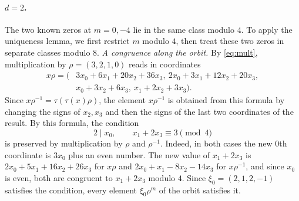 \documentclass[a4paper,11pt]{article}
\theoremstyle{plain}
\theoremstyle{definition}
\theoremstyle{remark}
\numberwithin{equation}{section}
\numberwithin{table}{section}
\begin{document}
\paragraph{$d=2$.}
The two known zeros at $m=0,-4$ lie in the same class modulo $4$. To apply the uniqueness lemma, we first restrict $m$ modulo $4$, then treat these two zeros in separate classes modulo $8$.
\emph{A congruence along the orbit.} By \eqref{eq:mult}, multiplication by $\rho=(3,2,1,0)$ reads in coordinates
\[
\begin{aligned}
x\rho=(&3x_0+6x_1+20x_2+36x_3,\ 2x_0+3x_1+12x_2+20x_3,\\
&x_0+3x_2+6x_3,\ x_1+2x_2+3x_3).
\end{aligned}
\]
Since $x\rho^{-1}=\tau(\tau(x)\rho)$, the element $x\rho^{-1}$ is obtained from this formula by changing the signs of $x_2,x_3$ and then the signs of the last two coordinates of the result.
By this formula, the condition
\[
2\mid x_0,\qquad x_1+2x_3\equiv3\pmod4
\]
is preserved by multiplication by $\rho$ and $\rho^{-1}$. Indeed, in both cases the new $0$th coordinate is $3x_0$ plus an even number. The new value of $x_1+2x_3$ is $2x_0+5x_1+16x_2+26x_3$ for $x\rho$ and $2x_0+x_1-8x_2-14x_3$ for $x\rho^{-1}$, and since $x_0$ is even, both are congruent to $x_1+2x_3$ modulo $4$.
Since $\xi_0=(2,1,2,-1)$ satisfies the condition, every element $\xi_0\rho^m$ of the orbit satisfies it.
\end{document}
